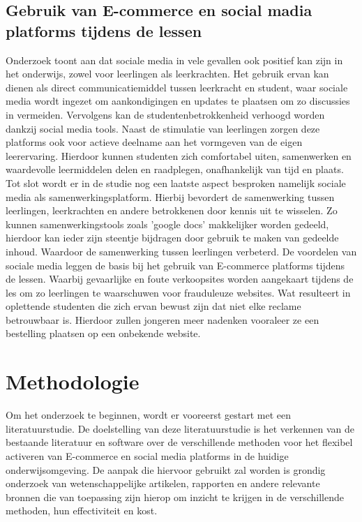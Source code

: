 \subsection{Gebruik van E-commerce en social madia platforms tijdens de lessen}
Onderzoek toont aan dat sociale media in vele gevallen ook positief kan zijn in het onderwijs, zowel voor leerlingen als leerkrachten. Het gebruik ervan kan dienen als direct communicatiemiddel tussen leerkracht en student, waar sociale media wordt ingezet om aankondigingen en updates te plaatsen om zo discussies in vermeiden. 
Vervolgens kan de studentenbetrokkenheid verhoogd worden dankzij social media tools. Naast de stimulatie van leerlingen zorgen deze platforms ook voor actieve deelname aan het vormgeven van de eigen leerervaring. Hierdoor kunnen studenten zich comfortabel uiten, samenwerken en waardevolle leermiddelen delen en raadplegen, onafhankelijk van tijd en plaats. \newline
Tot slot wordt er in de studie nog een laatste aspect besproken namelijk sociale media als samenwerkingsplatform. Hierbij bevordert de samenwerking tussen leerlingen, leerkrachten en andere betrokkenen door kennis uit te wisselen. Zo kunnen samenwerkingstools zoals 'google docs' makkelijker worden gedeeld, hierdoor kan ieder zijn steentje bijdragen door gebruik te maken van gedeelde inhoud. Waardoor de samenwerking tussen leerlingen verbeterd. \newline
De voordelen van sociale media leggen de basis bij het gebruik van E-commerce platforms tijdens de lessen. Waarbij gevaarlijke en foute verkoopsites worden aangekaart tijdens de les om zo leerlingen te waarschuwen voor frauduleuze websites. Wat resulteert in oplettende studenten die zich ervan bewust zijn dat niet elke reclame betrouwbaar is. Hierdoor zullen jongeren meer nadenken vooraleer ze een bestelling plaatsen op een onbekende website.   \autocite{benefitsofsocialmedia} \autocite{onlinefraude}


\section{Methodologie}%
\label{sec:methodologie}
Om het onderzoek te beginnen, wordt er vooreerst gestart met een literatuurstudie. De doelstelling van deze literatuurstudie is het verkennen van de bestaande literatuur en software over de verschillende methoden voor het flexibel activeren van E-commerce en social media platforms in de huidige onderwijsomgeving. De aanpak die hiervoor gebruikt zal worden is grondig onderzoek van wetenschappelijke artikelen, rapporten en andere relevante bronnen die van toepassing zijn hierop om inzicht te krijgen in de verschillende methoden, hun effectiviteit en kost. \newline

